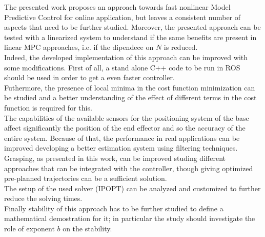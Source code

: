 The presented work proposes an approach towards fast nonlinear Model Predictive Control for online application, but leaves a consistent number of aspects that need to be further studied. Moreover, the presented approach can be tested with a linearized system to understand if the same benefits are present in linear MPC approaches, i.e. if the dipendece on $N$ is reduced.\\
Indeed, the developed implementation of this approach can be improved with some modifications. First of all, a stand alone C++ code to be run in ROS should be used in order to get a even faster controller.\\
Futhermore, the presence of local minima in the cost function minimization can be studied and a better understanding of the effect of different terms in the cost function is required for this. \\
The capabilities of the available sensors for the positioning system of the base affect significantly the position of the end effector and so the accuracy of the entire system. Because of that, the performance in real applications can be improved developing a better estimation system using filtering techniques. \\
Grasping, as presented in this work, can be improved studing different approaches that can be integrated with the controller, though giving optimized pre-planned trajectories can be a sufficient solution. \\
The setup of the used solver (IPOPT) can be analyzed and customized to further reduce the solving times. \\
Finally stability of this approach has to be further studied to define a mathematical demostration for it; in particular the study should investigate the role of exponent $b$ on the stability.


